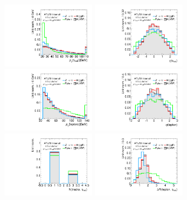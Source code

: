\begin{figure}[tp]
  \centering
  \includegraphics[width=0.35\textwidth]{figures/overlaid/boost/tau-pt}
  \includegraphics[width=0.35\textwidth]{figures/overlaid/boost/tau-eta}
  \includegraphics[width=0.35\textwidth]{figures/overlaid/boost/lep-pt-hi}
  \includegraphics[width=0.35\textwidth]{figures/overlaid/boost/lep-eta}
  \includegraphics[width=0.35\textwidth]{figures/overlaid/boost/tau-numTrack}
  \includegraphics[width=0.35\textwidth]{figures/overlaid/boost/taulep-dR}

\end{figure}
